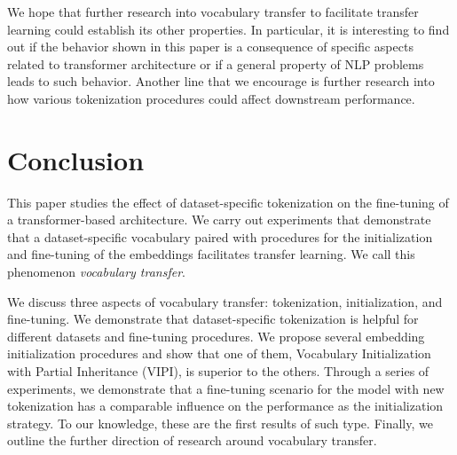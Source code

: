 \documentclass[review]{elsarticle}
\begin{document}

We hope that further research into vocabulary transfer to facilitate transfer learning could establish its other properties. In particular, it is interesting to find out if the behavior shown in this paper is a consequence of specific aspects related to transformer architecture or if a general property of NLP problems leads to such behavior. Another line that we encourage is further research into how various tokenization procedures could affect downstream performance.  


\section{Conclusion}

 This paper studies the effect of dataset-specific tokenization on the fine-tuning of a transformer-based architecture. We carry out experiments that demonstrate that a dataset-specific vocabulary paired with procedures for the initialization and fine-tuning of the embeddings facilitates transfer learning. We call this phenomenon {\em vocabulary transfer}. 
 
 We discuss three aspects of vocabulary transfer: tokenization, initialization, and fine-tuning. We demonstrate that dataset-specific tokenization is helpful for different datasets and fine-tuning procedures. We propose several embedding initialization procedures and show that one of them, Vocabulary Initialization with Partial Inheritance (VIPI), is superior to the others. Through a series of experiments, we demonstrate that a fine-tuning scenario for the model with new tokenization has a comparable influence on the performance as the initialization strategy. To our knowledge, these are the first results of such type. Finally, we outline the further direction of research around vocabulary transfer.


\end{document}

